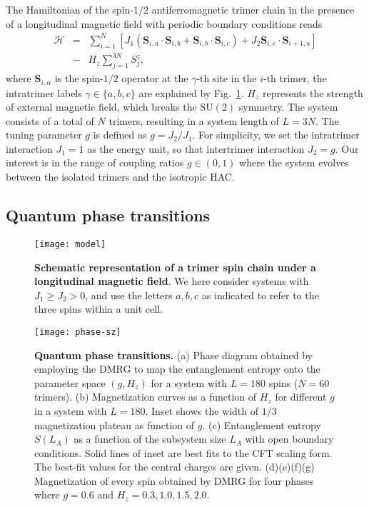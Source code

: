 \documentclass[aps,prx,showpacs,floatfix,twocolumn,superscriptaddress,nofootinbib,longbibliography]{revtex4-2}
\begin{document}
The Hamiltonian of the spin-$1/2$ antiferromagnetic trimer chain in the presence of a longitudinal magnetic field with periodic boundary conditions reads
\begin{eqnarray}
	\mathcal{H}&=&\sum_{i=1}^{N}\left[ J_1 \left(\mathbf{S}_{i,a}\cdot \mathbf{S}_{i,b} +\mathbf{S}_{i,b} \cdot \mathbf{S}_{i,c} \right)
	+ J_2 \mathbf{S}_{i,c} \cdot\mathbf{S}_{i+1,a} \right] \nonumber \\ 
	&-& H_z \sum_{j=1}^{3N} S_j^z,
\end{eqnarray}
where $\mathbf{ S}_{i,\alpha}$ is the spin-$1/2$ operator at the $\gamma$-th site in the $i$-th trimer, the intratrimer labels $\gamma \in \{a,b,c\}$ are explained
by Fig.~\ref{model}. $H_z$ represents the strength of external magnetic field, which  breaks the $\mathrm{SU}(2)$ symmetry.  The system consists of a total of $N$ trimers, resulting in a system length of $L=3N$.  The tuning parameter $g$ is defined as $g = J_2/J_1$. For simplicity, we set the
intratrimer interaction $J_1=1$ as the energy unit, so that intertrimer interaction $J_2=g$. Our interest is in the range of 
coupling ratios $g \in (0,1)$ where the system evolves between the isolated trimers and the isotropic  HAC.



\subsection{\label{subsec:cells} Quantum phase transitions}

\begin{figure}[t]
\texttt{[image: model]}
\caption{\textbf{Schematic representation of a trimer spin chain under a longitudinal magnetic field}. We here consider systems with $J_1 \geq J_2 >0$, and use the letters $a,b,c$ as indicated to
refer to the three spins within a unit cell.}
\label{model}
\end{figure} 


\begin{figure*}
\texttt{[image: phase-sz]}
\caption{\label{diagram} \textbf{Quantum phase transitions.} (a) Phase diagram 
 obtained by employing the DMRG to map the entanglement entropy onto the parameter space  $(g,H_z)$  for a system with $L=180$ spins ($N=60$ trimers).  (b) Magnetization curves as a function of $H_z$ for different $g$ in a system  with $L=180$. Inset shows the width of $1/3$ magnetization plateau as function of $g$. (c) Entanglement entropy $S(L_A)$ as a function of the subsystem size $L_A$ with open boundary conditions.  Solid lines of inset are best fits to the CFT scaling form. The best-fit values for the 	central charges  are  given. (d)(e)(f)(g) Magnetization of every spin obtained by DMRG for four phases where $g=0.6$ and $H_z =0.3, 1.0, 1.5, 2.0$. }
\end{figure*}
\end{document}
